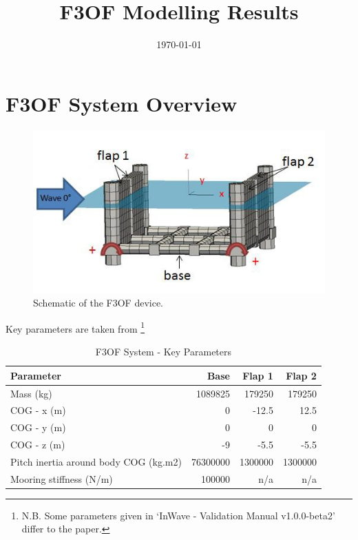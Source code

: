 \documentclass[11pt]{article}
\date{\today}
\title{F3OF Modelling Results}
\begin{document}
\maketitle
\tableofcontents

\clearpage

\section{F3OF System Overview}
\label{sec:org5a1202f}

\begin{figure}[htbp]
\centering
\includegraphics[width=.9\linewidth]{images/system/f3of.jpg}
\caption{\label{fig:org8863164}
Schematic of the F3OF device.}
\end{figure}

Key parameters are taken from \cite{Combourieu2015}  \footnote{N.B. Some parameters given in `InWave - Validation Manual v1.0.0-beta2' differ to the paper.}

\begin{table}[htbp]
\caption{\label{tab:orgbce3e80}
F3OF System - Key Parameters}
\centering
\begin{tabular}{lrrr}
Parameter & Base & Flap 1 & Flap 2\\
\hline
Mass (kg) & 1089825 & 179250 & 179250\\
COG - x (m) & 0 & -12.5 & 12.5\\
COG - y (m) & 0 & 0 & 0\\
COG - z (m) & -9 & -5.5 & -5.5\\
Pitch inertia around body COG (kg.m2) & 76300000 & 1300000 & 1300000\\
Mooring stiffness (N/m) & 100000 & n/a & n/a\\
\end{tabular}
\end{table}

\clearpage
\end{document}
